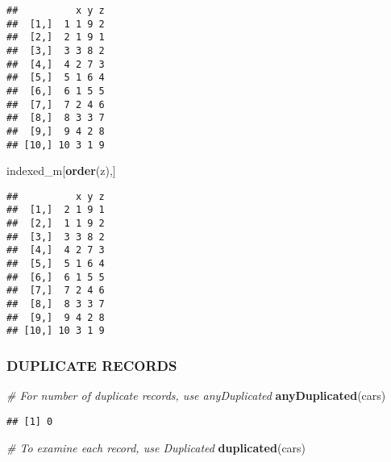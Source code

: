 \documentclass[11pt,]{article}
\newenvironment{Shaded}{\begin{snugshade}}{\end{snugshade}}
\newcommand{\CommentTok}[1]{\textcolor[rgb]{0.56,0.35,0.01}{\textit{#1}}}
\newcommand{\KeywordTok}[1]{\textcolor[rgb]{0.13,0.29,0.53}{\textbf{#1}}}
\newcommand{\NormalTok}[1]{#1}
\begin{document}
\begin{verbatim}
##          x y z
##  [1,]  1 1 9 2
##  [2,]  2 1 9 1
##  [3,]  3 3 8 2
##  [4,]  4 2 7 3
##  [5,]  5 1 6 4
##  [6,]  6 1 5 5
##  [7,]  7 2 4 6
##  [8,]  8 3 3 7
##  [9,]  9 4 2 8
## [10,] 10 3 1 9
\end{verbatim}

\begin{Shaded}
\begin{Highlighting}[]
\NormalTok{  indexed_m[}\KeywordTok{order}\NormalTok{(z),]}
\end{Highlighting}
\end{Shaded}

\begin{verbatim}
##          x y z
##  [1,]  2 1 9 1
##  [2,]  1 1 9 2
##  [3,]  3 3 8 2
##  [4,]  4 2 7 3
##  [5,]  5 1 6 4
##  [6,]  6 1 5 5
##  [7,]  7 2 4 6
##  [8,]  8 3 3 7
##  [9,]  9 4 2 8
## [10,] 10 3 1 9
\end{verbatim}

\hypertarget{duplicate-records}{%
\subsubsection{DUPLICATE RECORDS}\label{duplicate-records}}

\begin{Shaded}
\begin{Highlighting}[]
  \CommentTok{# For number of duplicate records, use anyDuplicated}
  \KeywordTok{anyDuplicated}\NormalTok{(cars)}
\end{Highlighting}
\end{Shaded}

\begin{verbatim}
## [1] 0
\end{verbatim}

\begin{Shaded}
\begin{Highlighting}[]
  \CommentTok{# To examine each record, use Duplicated}
  \KeywordTok{duplicated}\NormalTok{(cars)}
\end{Highlighting}
\end{Shaded}
\end{document}
